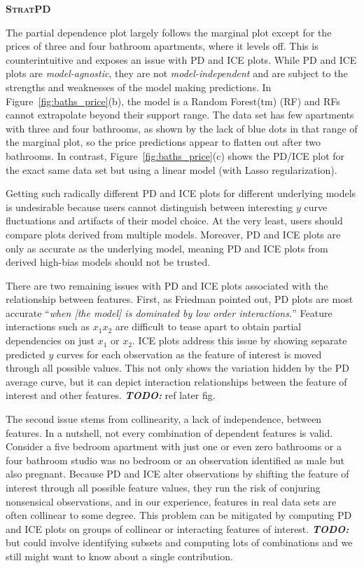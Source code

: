 \documentclass[12pt]{article}
\newcommand{\figref}[1]{Figure~\ref{#1}}
\newcommand{\todo}[1]{{\bf\em TODO:} #1}
\newcommand{\spd}{\fontfamily{cmr}\textsc{\textbf{StratPD}}}
\begin{document}
\spd

The partial dependence plot largely follows the marginal plot except for the prices of three and four bathroom apartments, where it levels off. This is counterintuitive and exposes an issue with PD and ICE plots. While PD and ICE plots are {\em model-agnostic}, they are not {\em model-independent} and are subject to the strengths and weaknesses of the model making predictions. In \figref{fig:baths_price}(b), the model is a Random Forest(tm) (RF) and RFs cannot extrapolate beyond their support range.  The data set has few apartments with three and four bathrooms, as shown by the lack of blue dots in that range of the marginal plot, so the price predictions appear to flatten out after two bathrooms.  In contrast, \figref{fig:baths_price}(c) shows the PD/ICE plot for the exact same data set but using a linear model (with Lasso regularization).

Getting such radically different PD and ICE plots for different underlying models is undesirable because users cannot distinguish between interesting $y$ curve fluctuations and artifacts of their model choice. At the very least, users should compare plots derived from multiple models. Moreover, PD and ICE plots are only as accurate as the underlying model, meaning PD and ICE plots from derived high-bias models should not be trusted.

There are two remaining issues with PD and ICE plots associated with the relationship between features. First, as Friedman pointed out, PD plots are most accurate ``{\em when {\em [the model]} is dominated by low order interactions.}''  Feature interactions such as $x_1x_2$ are difficult to tease apart to obtain partial dependencies on just $x_1$ or $x_2$. ICE plots address this issue by showing separate predicted $y$ curves for each observation as the feature of interest is moved through all possible values.  This not only shows the variation hidden by the PD average curve, but it can depict interaction relationships between the feature of interest and other features. \todo{ref later fig}.

The second issue stems from collinearity, a lack of independence, between features.  In a nutshell, not every combination of dependent features is valid. Consider a five bedroom apartment with just one or even zero bathrooms or a four bathroom studio was no bedroom or an observation identified as male but also pregnant.  Because PD and ICE alter observations by shifting the feature of interest through all possible feature values, they run the risk of conjuring nonsensical observations, and in our experience, features in real data sets are often collinear to some degree. This problem can be mitigated by computing PD and ICE plots on groups of collinear or interacting features of interest. \todo{but could involve identifying subsets and computing lots of combinations and we still might want to know about a single contribution.}
\end{document}
